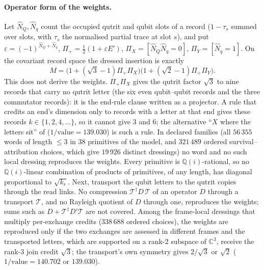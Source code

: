 \documentclass[11pt]{article}
\theoremstyle{remark}
\begin{document}
\paragraph{Operator form of the weights.} Let $\hat N_Q,\hat N_q$ count the occupied qutrit and qubit slots of a record ($1-\tau_s$ summed over slots, with $\tau_s$ the normalised partial trace at slot $s$), and put $\varepsilon=(-1)^{\hat N_Q+\hat N_q}$, $\Pi_+=\tfrac12(1+\varepsilon E')$, $\Pi_X=[\hat N_Q\hat N_q=0]$, $\Pi_Y=[\hat N_q=1]$. On the covariant record space the dressed insertion is exactly
\[ M=\bigl(1+(\sqrt3-1)\Pi_+\Pi_X\bigr)\bigl(1+(\sqrt2-1)\Pi_+\Pi_Y\bigr). \]
This does not derive the weights. $\Pi_+\Pi_X$ gives the qutrit factor $\sqrt3$ to nine records that carry no qutrit letter (the six even qubit--qubit records and the three commutator records): it is the end-rule clause written as a projector. A rule that credits an end's dimension only to records with a letter at that end gives these records $k\in\{1,2,4,\dots\}$, so it cannot give $3$ and $6$; the alternative ``$X$ where the letters sit'' of \cite[Table S5]{wg} ($1/\text{value}=139.030$) is such a rule. In declared families (all $56\,355$ words of length $\le3$ in $38$ primitives of the model, and $321\,489$ ordered survival--attribution choices, which give $19\,926$ distinct dressings) no word and no such local dressing reproduces the weights. Every primitive is $\mathbb Q(i)$-rational, so no $\mathbb Q(i)$-linear combination of products of primitives, of any length, has diagonal proportional to $\sqrt{k_r}$. Next, transport the qubit letters to the qutrit copies through the read links. No compression $\mathcal T^\dagger D\,\mathcal T$ of an operator $D$ through a transport $\mathcal T$, and no Rayleigh quotient of $D$ through one, reproduces the weights; sums such as $D+\mathcal T^\dagger D'\mathcal T$ are not covered. Among the frame-local dressings that multiply per-exchange credits ($338\,688$ ordered choices), the weights are reproduced only if the two exchanges are assessed in different frames and the transported letters, which are supported on a rank-$2$ subspace of $\mathbb C^3$, receive the rank-$3$ join credit $\sqrt3$; the transport's own symmetry gives $2/\sqrt3$ or $\sqrt2$ ($1/\text{value}=140.702$ or $139.030$).
\end{document}
